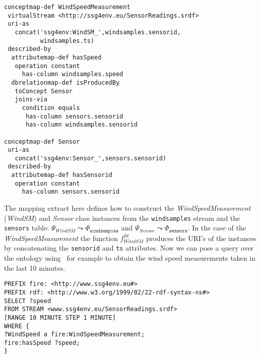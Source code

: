 \begin{lstlisting}[style=R2OStyle,language=R2O,frame=none]
conceptmap-def WindSpeedMeasurement
 virtualStream <http://ssg4env.eu/SensorReadings.srdf>
 uri-as
   concat('ssg4env:WindSM_',windsamples.sensorid,
          windsamples.ts)
 described-by
  attributemap-def hasSpeed
   operation constant
     has-column windsamples.speed
  dbrelationmap-def isProducedBy
   toConcept Sensor
   joins-via
     condition equals
      has-column sensors.sensorid
      has-column windsamples.sensorid

conceptmap-def Sensor
 uri-as
   concat('ssg4env:Sensor_',sensors.sensorid)
 described-by
  attributemap-def hasSensorid
   operation constant
     has-column sensors.sensorid
\end{lstlisting}
%
The mapping extract here defines how to construct the \textit{WindSpeedMeasurement} (\textit{WindSM}) and \textit{Sensor} class instances from the \texttt{windsamples} stream and the \texttt{sensors} table: \linebreak $\Psi_{WindSM}\leadsto \Phi_{\mathtt{windsamples}}$ and $\Psi_{Sensor}\leadsto \Phi_{\mathtt{sensors}}$. In the case of the \textit{WindSpeedMeasurement} the function $f_{WindSM}^{Id}$ produces the URI's of the instances by concatenating the \texttt{sensorid} and \texttt{ts} attributes.
Now we can pose a query over the ontology using \sparqlstr\, for example to obtain the wind speed measurements taken in the last 10 minutes.
\begin{lstlisting}[style=SPARQLSTRStyle,language=SPARQLSTR,frame=none]
PREFIX fire: <http://www.ssg4env.eu#>
PREFIX rdf: <http://www.w3.org/1999/02/22-rdf-syntax-ns#>
SELECT ?speed
FROM STREAM <www.ssg4env.eu/SensorReadings.srdf> 
[RANGE 10 MINUTE STEP 1 MINUTE]
WHERE {
?WindSpeed a fire:WindSpeedMeasurement;
fire:hasSpeed ?speed;
}
\end{lstlisting}

